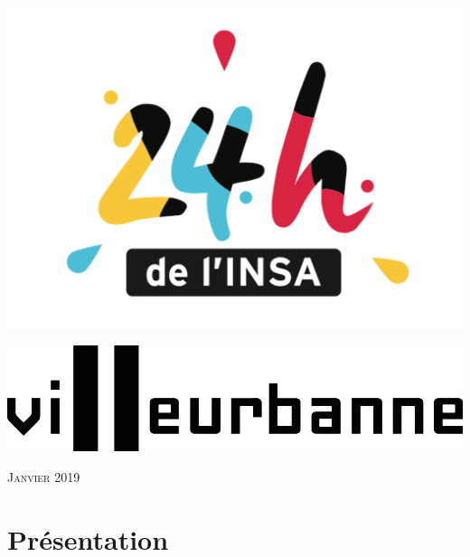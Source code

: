 \documentclass[hidelinks, paper=a4, fontsize=13pt]{report}
\begin{document}
   \begin{minipage}[c]{.46\linewidth}
	\includegraphics[scale=0.2]{Annexes/Images/logo24h.png}\\
   \end{minipage} \hfill
   \begin{minipage}[c]{.46\linewidth}
\includegraphics[scale=1]{Annexes/Images/villeurnoir}\\
   \end{minipage}
\begin{flushright}
\vspace{15mm}


{\large\textsc{Janvier 2019}}

\vspace{15mm}


\end{flushright}

\newpage


\chapter{Présentation}
\end{document}
